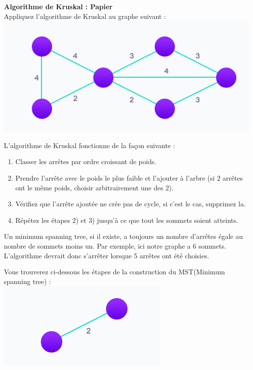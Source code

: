 \begin{Exercice}[5 minutes] \textbf{Algorithme de Kruskal : Papier}\\
    Appliquez l'algorithme de Kruskal au graphe suivant :\\
    \includegraphics[]{Kruskal.PNG}
    \begin{conseil}
        L'algorithme de Kruskal fonctionne de la façon suivante :
        \begin{enumerate}
            \item Classer les arrêtes par ordre croissant de poids.
            \item Prendre l'arrête avec le poids le plus faible et l'ajouter à l'arbre (si 2 arrêtes ont le même poids, choisir arbitrairement une des 2).
            \item Vérifiez que l'arrête ajoutée ne crée pas de cycle, si c'est le cas, supprimez la.
            \item Répétez les étapes 2) et 3) jusqu'à ce que tout les sommets soient atteints.
        \end{enumerate}
        Un minimum spanning tree, si il existe, a toujours un nombre d'arrêtes égale au nombre de sommets moins un. Par exemple, ici notre graphe a 6 sommets. L'algorithme devrait donc s'arrêter lorsque 5 arrêtes ont été choisies.
    \end{conseil}
    \begin{solution}
        Vous trouverez ci-dessous les étapes de la construction du MST(Minimum spanning tree) :\\
        \includegraphics[]{Week 7/K1.PNG}\\

\end{solution}
\end{Exercice}
